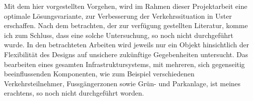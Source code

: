 Mit dem hier vorgestellten Vorgehen, wird im Rahmen dieser Projektarbeit eine optimale Lösungsvariante, zur Verbesserung der Verkehrssituation in Uster erschaffen. Nach dem betrachten, der zur verfügung gestellten Literatur, komme ich zum Schluss, dass eine solche Untersuchung, so noch nicht durchgeführt wurde. In den betrachteten Arbeiten wird jeweils nur ein Objekt hinsichtlich der Flexibilität des Designs auf unsichere zukünftige Gegebenheiten untersucht. Das bearbeiten eines gesamten Infrastruktursystems, mit mehreren, sich gegenseitig beeinflussenden Komponenten, wie zum Beispiel verschiedenen Verkehrsteilnehmer, Fussgängerzonen sowie Grün- und Parkanlage, ist meines erachtens, so noch nicht durchgeführt worden.

%

